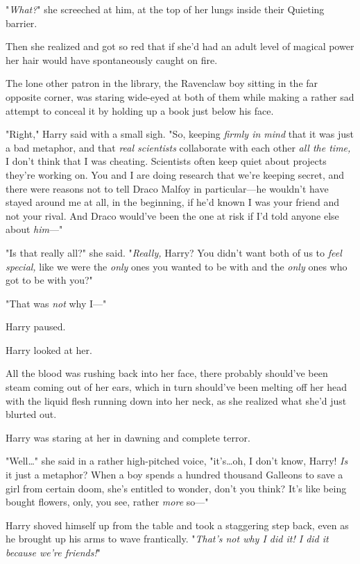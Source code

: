 "\emph{What?}" she screeched at him, at the top of her lungs inside their
Quieting barrier.

Then she realized and got so red that if she’d had an adult level of magical
power her hair would have spontaneously caught on fire.

The lone other patron in the library, the Ravenclaw boy sitting in the far
opposite corner, was staring wide-eyed at both of them while making a rather
sad attempt to conceal it by holding up a book just below his face.

"Right," Harry said with a small sigh. "So, keeping \emph{firmly in mind} that
it was just a bad metaphor, and that \emph{real scientists} collaborate with
each other \emph{all the time,} I don’t think that I was cheating. Scientists
often keep quiet about projects they’re working on. You and I are doing
research that we’re keeping secret, and there were reasons not to tell Draco
Malfoy in particular—he wouldn’t have stayed around me at all, in the
beginning, if he’d known I was your friend and not your rival. And Draco
would’ve been the one at risk if I’d told anyone else about \emph{him}—"

"Is that really all?" she said. "\emph{Really,} Harry? You didn’t want both of
us to \emph{feel special,} like we were the \emph{only} ones you wanted to be
with and the \emph{only} ones who got to be with you?"

"That was \emph{not} why I—"

Harry paused.

Harry looked at her.

All the blood was rushing back into her face, there probably should’ve been
steam coming out of her ears, which in turn should’ve been melting off her head
with the liquid flesh running down into her neck, as she realized what she’d
just blurted out.

Harry was staring at her in dawning and complete terror.

"Well…" she said in a rather high-pitched voice, "it’s…oh, I
don’t know, Harry! \emph{Is} it just a metaphor? When a boy spends a hundred
thousand Galleons to save a girl from certain doom, she’s entitled to wonder,
don’t you think? It’s like being bought flowers, only, you see, rather
\emph{more} so—"

Harry shoved himself up from the table and took a staggering step back, even as
he brought up his arms to wave frantically. "\emph{That’s not why I did it! I
did it because we’re friends!}"

